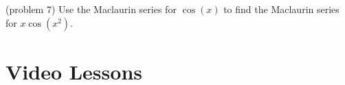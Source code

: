 \documentclass[handout]{ximera}
\begin{document}
\begin{problem}(problem 7)
Use the Maclaurin series for $\cos(x)$ to find the Maclaurin series for $x \cos(x^2)$.
\begin{multipleChoice}
\end{multipleChoice}
\end{problem}


\section{Video Lessons}


\begin{center}
\begin{foldable}
\end{foldable}
\end{center}
\end{document}
